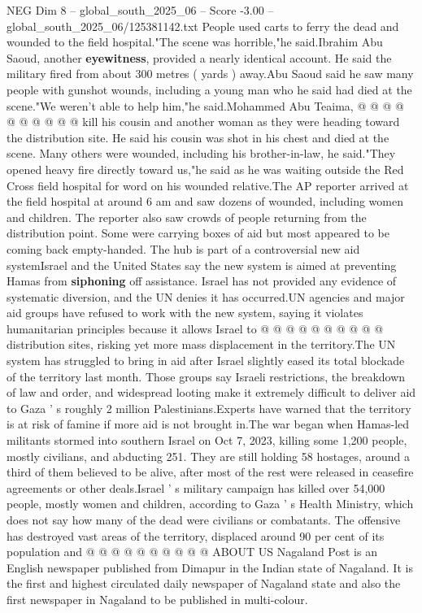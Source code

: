 \begin{textsample}{NEG Dim 8 – global\_south\_2025\_06 – Score -3.00 – global\_south\_2025\_06/125381142.txt}
People used carts to ferry the dead and wounded to the field hospital."The scene was horrible,"he said.Ibrahim Abu Saoud, another \textbf{eyewitness}, provided a nearly identical account.
He said the military fired from about 300 metres ( yards ) away.Abu Saoud said he saw many people with gunshot wounds, including a young man who he said had died at the scene."We weren't able to help him,"he said.Mohammed Abu Teaima, @ @ @ @ @ @ @ @ @ @ kill his cousin and another woman as they were heading toward the distribution site.
He said his cousin was shot in his chest and died at the scene.
Many others were wounded, including his brother-in-law, he said."They opened heavy fire directly toward us,"he said as he was waiting outside the Red Cross field hospital for word on his wounded relative.The AP reporter arrived at the field hospital at around 6 am and saw dozens of wounded, including women and children.
The reporter also saw crowds of people returning from the distribution point.
Some were carrying boxes of aid but most appeared to be coming back empty-handed.
The hub is part of a controversial new aid systemIsrael and the United States say the new system is aimed at preventing Hamas from \textbf{siphoning} off assistance.
Israel has not provided any evidence of systematic diversion, and the UN denies it has occurred.UN agencies and major aid groups have refused to work with the new system, saying it violates humanitarian principles because it allows Israel to @ @ @ @ @ @ @ @ @ @ distribution sites, risking yet more mass displacement in the territory.The UN system has struggled to bring in aid after Israel slightly eased its total blockade of the territory last month.
Those groups say Israeli restrictions, the breakdown of law and order, and widespread looting make it extremely difficult to deliver aid to Gaza ' s roughly 2 million Palestinians.Experts have warned that the territory is at risk of famine if more aid is not brought in.The war began when Hamas-led militants stormed into southern Israel on Oct 7, 2023, killing some 1,200 people, mostly civilians, and abducting 251.
They are still holding 58 hostages, around a third of them believed to be alive, after most of the rest were released in ceasefire agreements or other deals.Israel ' s military campaign has killed over 54,000 people, mostly women and children, according to Gaza ' s Health Ministry, which does not say how many of the dead were civilians or combatants.
The offensive has destroyed vast areas of the territory, displaced around 90 per cent of its population and @ @ @ @ @ @ @ @ @ @ ABOUT US Nagaland Post is an English newspaper published from Dimapur in the Indian state of Nagaland.
It is the first and highest circulated daily newspaper of Nagaland state and also the first newspaper in Nagaland to be published in multi-colour.

\end{textsample}
